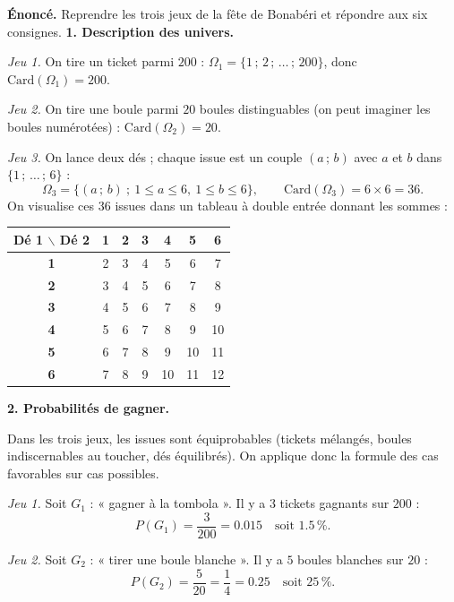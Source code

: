 \documentclass[11pt]{article}
\begin{document}
\begin{exoresolu}
\textbf{Énoncé.} Reprendre les trois jeux de la fête de Bonabéri et répondre aux six consignes.
\tcblower
\textbf{1. Description des univers.}

\emph{Jeu 1.} On tire un ticket parmi $200$ : $\Omega_1=\{1\,;\,2\,;\,\ldots\,;\,200\}$, donc $\mathrm{Card}(\Omega_1)=200$.

\emph{Jeu 2.} On tire une boule parmi $20$ boules distinguables (on peut imaginer les boules numérotées) : $\mathrm{Card}(\Omega_2)=20$.

\emph{Jeu 3.} On lance deux dés ; chaque issue est un couple $(a\,;\,b)$ avec $a$ et $b$ dans $\{1\,;\,\ldots\,;\,6\}$ :
\[ \Omega_3=\{(a\,;\,b)\ ;\ 1\le a\le 6,\ 1\le b\le 6\},\qquad \mathrm{Card}(\Omega_3)=6\times 6=36. \]
On visualise ces $36$ issues dans un tableau à double entrée donnant les sommes :

\begin{center}
\begin{tabular}{|c|cccccc|}
\hline
\rowcolor{popblueL} \textbf{Dé 1 $\backslash$ Dé 2} & \textbf{1} & \textbf{2} & \textbf{3} & \textbf{4} & \textbf{5} & \textbf{6} \\
\hline
\textbf{1} & 2 & 3 & 4 & 5 & 6 & \cellcolor{popgreenL}7 \\
\textbf{2} & 3 & 4 & 5 & 6 & \cellcolor{popgreenL}7 & 8 \\
\textbf{3} & 4 & 5 & 6 & \cellcolor{popgreenL}7 & 8 & 9 \\
\textbf{4} & 5 & 6 & \cellcolor{popgreenL}7 & 8 & 9 & 10 \\
\textbf{5} & 6 & \cellcolor{popgreenL}7 & 8 & 9 & 10 & \cellcolor{popgreenL}11 \\
\textbf{6} & \cellcolor{popgreenL}7 & 8 & 9 & 10 & \cellcolor{popgreenL}11 & 12 \\
\hline
\end{tabular}
\end{center}

\textbf{2. Probabilités de gagner.}

Dans les trois jeux, les issues sont équiprobables (tickets mélangés, boules indiscernables au toucher, dés équilibrés). On applique donc la formule des cas favorables sur cas possibles.

\emph{Jeu 1.} Soit $G_1$ : « gagner à la tombola ». Il y a $3$ tickets gagnants sur $200$ :
\[ P(G_1)=\dfrac{3}{200}=\num{0,015} \quad\text{soit } \num{1,5}\,\%. \]

\emph{Jeu 2.} Soit $G_2$ : « tirer une boule blanche ». Il y a $5$ boules blanches sur $20$ :
\[ P(G_2)=\dfrac{5}{20}=\dfrac{1}{4}=\num{0,25} \quad\text{soit } \num{25}\,\%. \]


\end{exoresolu}
\end{document}
